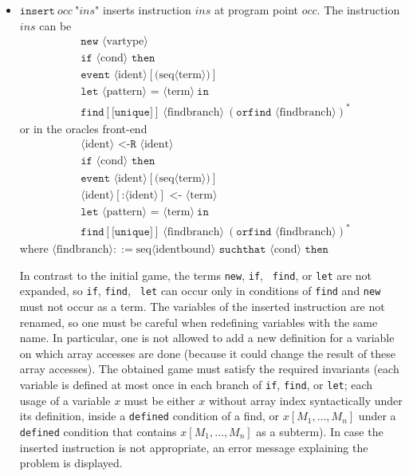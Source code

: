 \documentclass{article}
\newcommand{\nonterm}[1]{\langle\textrm{#1}\rangle}
\newcommand{\seq}[1]{\textrm{seq}\nonterm{#1}}
\begin{document}
\begin{itemize}
\item $\texttt{insert}\ occ\ \texttt{"}ins\texttt{"}$ inserts instruction $ins$ at
program point $occ$. The instruction $ins$ can be 
\begin{align*}
&\texttt{new\ }\nonterm{vartype}\\
&\texttt{if }\nonterm{cond}\texttt{ then}\\
&\texttt{event }\nonterm{ident}[\texttt{(}\seq{term}\texttt{)}]\\
&\texttt{let }\nonterm{pattern} \texttt{ = }\nonterm{term}\ \texttt{in}\\
&\texttt{find}[\texttt{[unique]}]\ \nonterm{findbranch}\ (\texttt{orfind }\nonterm{findbranch})^*
\end{align*}
or in the oracles front-end
\begin{align*}
&\nonterm{ident}\texttt{ <-R }\nonterm{ident}\\
&\texttt{if }\nonterm{cond}\texttt{ then}\\
&\texttt{event }\nonterm{ident}[\texttt{(}\seq{term}\texttt{)}]\\
&\nonterm{ident}[\texttt{:}\nonterm{ident}] \texttt{ <- }\nonterm{term}\\
&\texttt{let }\nonterm{pattern} \texttt{ = }\nonterm{term}\ \texttt{in}\\
&\texttt{find}[\texttt{[unique]}]\ \nonterm{findbranch}\ (\texttt{orfind }\nonterm{findbranch})^*
\end{align*}
where $\nonterm{findbranch} ::= \seq{identbound} \texttt{ suchthat }\nonterm{cond}\texttt{ then}$

In contrast to the initial game, the terms {\tt new}, {\tt if}, {\tt
  find}, or {\tt let} are not expanded, so {\tt if}, {\tt find}, {\tt
  let} can occur only in conditions of {\tt find} and {\tt new} must
not occur as a term.
%
The variables of the inserted instruction are not renamed, so one must
be careful when redefining variables with the same name. In
particular, one is not allowed to add a new definition for a variable
on which array accesses are done (because it could change the result
of these array accesses).
%
The obtained game must satisfy the required invariants (each variable
is defined at most once in each branch of {\tt if}, {\tt find}, or {\tt let};
each usage of a variable $x$ must be either $x$ without array index syntactically
under its definition, inside a {\tt defined} condition of a find, or
$x[M_1, \dots, M_n]$ under a {\tt defined} condition that contains $x[M_1, \dots, M_n]$ 
as a subterm). 
%
In case the inserted instruction is not appropriate, an error
message explaining the problem is displayed.


\end{itemize}
\end{document}
